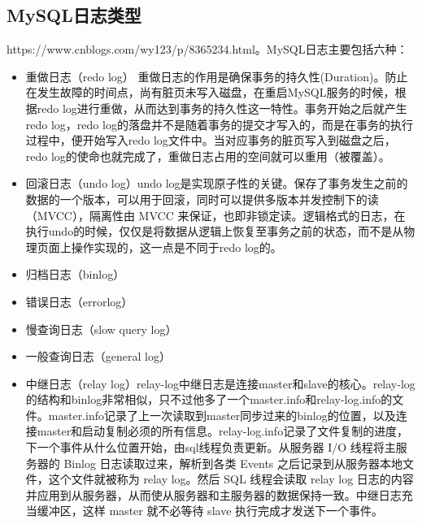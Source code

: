 \documentclass[../../../interview-questions.tex]{subfiles}
\begin{document}
\subsection{MySQL日志类型}

https://www.cnblogs.com/wy123/p/8365234.html。MySQL日志主要包括六种：

\begin{itemize}
    \item {重做日志（redo log）} 重做日志的作用是确保事务的持久性(Duration)。防止在发生故障的时间点，尚有脏页未写入磁盘，在重启MySQL服务的时候，根据redo log进行重做，从而达到事务的持久性这一特性。事务开始之后就产生redo log，redo log的落盘并不是随着事务的提交才写入的，而是在事务的执行过程中，便开始写入redo log文件中。当对应事务的脏页写入到磁盘之后，redo log的使命也就完成了，重做日志占用的空间就可以重用（被覆盖）。
    \item {回滚日志（undo log）}undo log是实现原子性的关键。保存了事务发生之前的数据的一个版本，可以用于回滚，同时可以提供多版本并发控制下的读（MVCC），隔离性由 MVCC 来保证，也即非锁定读。逻辑格式的日志，在执行undo的时候，仅仅是将数据从逻辑上恢复至事务之前的状态，而不是从物理页面上操作实现的，这一点是不同于redo log的。
    \item {归档日志（binlog）}
    \item {错误日志（errorlog）}
    \item {慢查询日志（slow query log）}
    \item {一般查询日志（general log）}
    \item {中继日志（relay log）}relay-log中继日志是连接master和slave的核心。relay-log的结构和binlog非常相似，只不过他多了一个master.info和relay-log.info的文件。master.info记录了上一次读取到master同步过来的binlog的位置，以及连接master和启动复制必须的所有信息。relay-log.info记录了文件复制的进度，下一个事件从什么位置开始，由sql线程负责更新。从服务器 I/O 线程将主服务器的 Binlog 日志读取过来，解析到各类 Events 之后记录到从服务器本地文件，这个文件就被称为 relay log。然后 SQL 线程会读取 relay log 日志的内容并应用到从服务器，从而使从服务器和主服务器的数据保持一致。中继日志充当缓冲区，这样 master 就不必等待 slave 执行完成才发送下一个事件。
\end{itemize}
\end{document}
